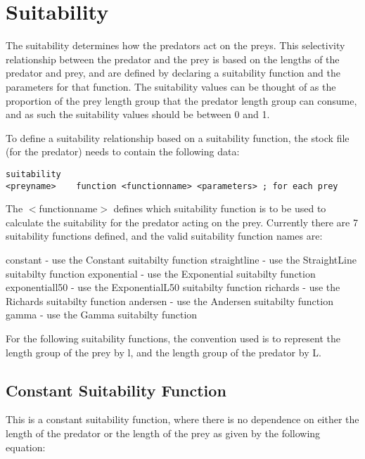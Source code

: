 \documentclass[10pt,twoside]{book}
\begin{document}
\section{Suitability}\label{sec:suitability}
The suitability determines how the predators act on the preys.  This selectivity relationship between the predator and the prey is based on the lengths of the predator and prey, and are defined  by declaring a suitability function and the parameters for that function.  The suitability values can be thought of as the proportion of the prey length group that the predator length group can consume, and as such the suitability values should be between 0 and 1.

\bigskip
To define a suitability relationship based on a suitability function, the stock file (for the predator) needs to contain the following data:

{\small\begin{verbatim}
suitability
<preyname>    function <functionname> <parameters> ; for each prey
\end{verbatim}}

The $<$functionname$>$ defines which suitability function is to be used to calculate the suitability for the predator acting on the prey.  Currently there are 7 suitability functions defined, and the valid suitability function names are:

\bigskip
constant - use the Constant suitabilty function\newline
straightline - use the StraightLine suitabilty function\newline
exponential - use the Exponential suitabilty function\newline
exponentiall50 - use the ExponentialL50 suitabilty function\newline
richards - use the Richards suitabilty function\newline
andersen - use the Andersen suitabilty function\newline
gamma - use the Gamma suitabilty function

\bigskip
For the following suitability functions, the convention used is to represent the length group of the prey by l, and the length group of the predator by L.

\subsection{Constant Suitability Function}
This is a constant suitability function, where there is no dependence on either the length of the predator or the length of the prey as given by the following equation:
\end{document}
